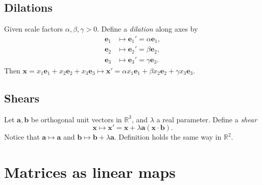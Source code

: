 \documentclass[10pt]{article}
\begin{document}
    \subsection{Dilations}
    Given scale factors $ \alpha,\beta,\gamma>0 $. Define a \textit{dilation} along axes by 
    \[
        \begin{aligned}
             \mathbf{e}_1 &\mapsto \mathbf{e}_1'=\alpha \mathbf{e}_1,\\
             \mathbf{e}_2 &\mapsto \mathbf{e}_2'=\beta \mathbf{e}_2,\\
             \mathbf{e}_3 &\mapsto \mathbf{e}_3'=\gamma \mathbf{e}_3.
        \end{aligned}
    \]
    Then $ \mathbf{x}=x_1 \mathbf{e}_1+x_2 \mathbf{e}_2 +x_3 \mathbf{e}_3 \mapsto \mathbf{x}'=\alpha x_1 \mathbf{e}_1+\beta x_2 \mathbf{e}_2 +\gamma x_3 \mathbf{e}_3 $.
    \subsection{Shears}
    Let $ \mathbf{a},\mathbf{b} $ be orthogonal unit vectors in $ \mathbb{R}^{3} $, and $ \lambda $ a real parameter. Define a \textit{shear}
    \[
        \mathbf{x} \mapsto \mathbf{x}'=\mathbf{x}+\lambda \mathbf{a}(\mathbf{x}\cdot \mathbf{b})
    .\]
    Notice that $ \mathbf{a}\mapsto \mathbf{a} $ and $ \mathbf{b} \mapsto \mathbf{b}+\lambda \mathbf{a} $. Definition holds the same way in $ \mathbb{R}^{2} $.
    \section{Matrices as linear maps}
\end{document}
